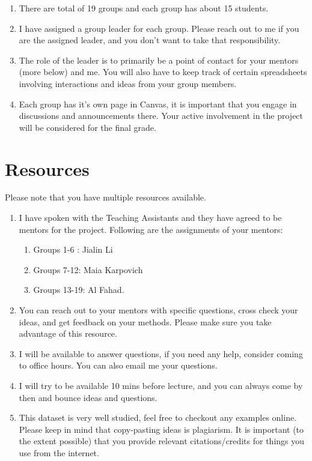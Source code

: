 \documentclass[11pt]{article}
\begin{document}
\begin{enumerate}
\item There are total of 19 groups and each group has about 15 students.
\item I have assigned a group leader for each group. Please reach out to me if you are the assigned leader, and you don't want to take that responsibility. 
\item The role of the leader is to primarily be a point of contact for your mentors (more below) and me. You will also have to keep track of certain spreadsheets involving interactions and ideas from your group members. 
\item Each group has it's own page in Canvas, it is important that you engage in discussions and announcements there. Your active involvement in the project will be considered for the final grade. 
\end{enumerate}
 
\section{Resources} 
Please note that you have multiple resources available. 
\begin{enumerate}
\item I have spoken with the Teaching Assistants and they have agreed to be mentors for the project. Following are the assignments of your mentors:
\begin{enumerate}
\item Groups 1-6 : Jialin Li
\item Groups 7-12: Maia Karpovich
\item Groups 13-19: Al Fahad.
\end{enumerate}
\item You can reach out to your mentors with specific questions, cross check your ideas, and get feedback on your methods. Please make sure you take advantage of this resource. 
\item I will be available to answer questions, if you need any help, consider coming to office hours. You can also email me your questions. 
\item I will try to be available 10 mins before lecture, and you can always come by then and bounce ideas and questions. 
\item This dataset is very well studied, feel free to checkout any examples online. Please keep in mind that copy-pasting ideas is plagiarism. It is important (to the extent possible) that you provide relevant citations/credits for things you use from the internet. 
\end{enumerate}
\end{document}
